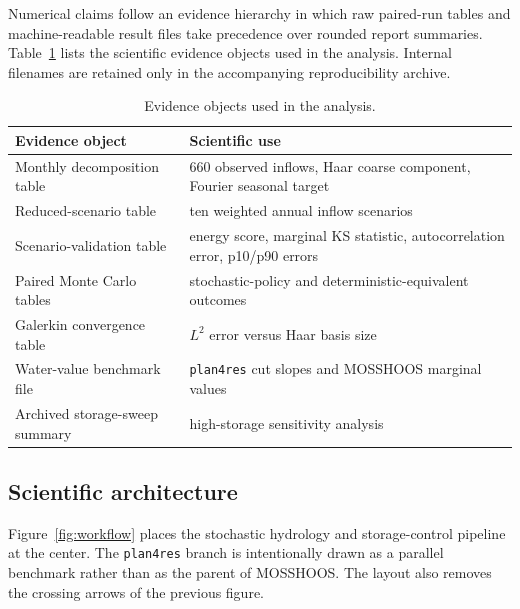 \documentclass[11pt,a4paper]{article}
\begin{document}
Numerical claims follow an evidence hierarchy in which raw paired-run tables and
machine-readable result files take precedence over rounded report summaries.
Table~\ref{tab:evidence} lists the scientific evidence objects used in the analysis. Internal filenames are retained only in the accompanying reproducibility archive.

\begin{table}[t]
\centering
\caption{Evidence objects used in the analysis.}
\label{tab:evidence}
\begin{tabular}{p{}p{}}
\toprule
Evidence object & Scientific use \\
\midrule
Monthly decomposition table & 660 observed inflows, Haar coarse component, Fourier seasonal target \\
Reduced-scenario table & ten weighted annual inflow scenarios \\
Scenario-validation table & energy score, marginal KS statistic, autocorrelation error, p10/p90 errors \\
Paired Monte Carlo tables & stochastic-policy and deterministic-equivalent outcomes \\
Galerkin convergence table & $L^2$ error versus Haar basis size \\
Water-value benchmark file & \texttt{plan4res} cut slopes and MOSSHOOS marginal values \\
Archived storage-sweep summary & high-storage sensitivity analysis \\
\bottomrule
\end{tabular}
\end{table}

\subsection{Scientific architecture}
Figure~\ref{fig:workflow} places the stochastic hydrology and storage-control
pipeline at the center. The \texttt{plan4res} branch is intentionally drawn as a
parallel benchmark rather than as the parent of MOSSHOOS. The layout also removes
the crossing arrows of the previous figure.
\end{document}
